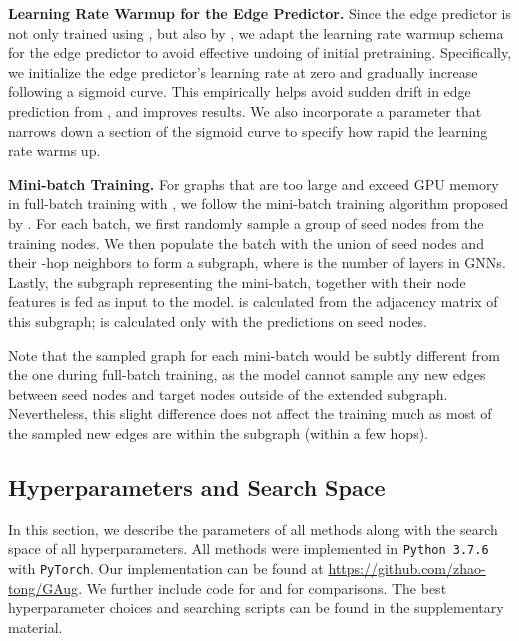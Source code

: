 \documentclass[letterpaper]{article} \usepackage{aaai21}  \usepackage{times}  \usepackage{helvet} \usepackage{courier}  \usepackage[hyphens]{url}  \usepackage{graphicx} \urlstyle{rm} \def\UrlFont{\rm}  \usepackage{natbib}  \usepackage{caption} \frenchspacing  \setlength{\pdfpagewidth}{8.5in}  \setlength{\pdfpageheight}{11in}
\begin{document}
\noindent \textbf{Learning Rate Warmup for the Edge Predictor.} 
Since the edge predictor is not only trained using , but also by , we adapt the learning rate warmup schema \cite{goyal2017accurate} for the edge predictor to avoid effective undoing of initial pretraining. Specifically, we initialize the edge predictor's learning rate at zero and gradually increase following a sigmoid curve. This empirically helps avoid sudden drift in edge prediction from , and improves results. 
We also incorporate a parameter that narrows down a section of the sigmoid curve to specify how rapid the learning rate warms up.

\noindent \textbf{Mini-batch Training.}
For graphs that are too large and exceed GPU memory in full-batch training with \method, we follow the mini-batch training algorithm proposed by \citet{hamilton2017inductive}. For each batch, we first randomly sample a group of seed nodes from the training nodes. We then populate the batch with the union of seed nodes and their -hop neighbors to form a subgraph, where  is the number of layers in GNNs. Lastly, the subgraph representing the mini-batch, together with their node features is fed as input to the model.  is calculated from the adjacency matrix of this subgraph;  is calculated only with the predictions on seed nodes. 


Note that the sampled graph for each mini-batch would be subtly different from the one during full-batch training, as the model cannot sample any new edges between seed nodes and target nodes outside of the extended subgraph. Nevertheless, this slight difference does not affect the training much as most of the sampled new edges are within the subgraph (within a few hops).

\subsection{Hyperparameters and Search Space}
\label{appn:hyperparamter}
In this section, we describe the parameters of all methods along with the search space of all hyperparameters. All methods were implemented in \verb+Python 3.7.6+ with \verb+PyTorch+. Our implementation can be found at \url{https://github.com/zhao-tong/GAug}.  We further include code for \adaedge \cite{chen2019measuring} and \dropedge \cite{rong2019dropedge} for comparisons. The best hyperparameter choices and searching scripts can be found in the supplementary material.
\end{document}
